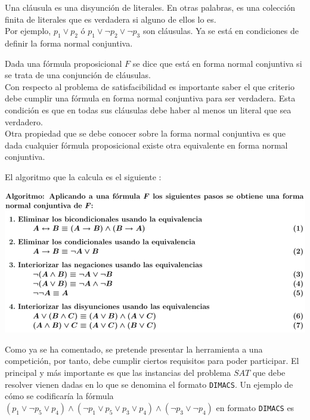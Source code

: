  Una cláusula es una disyunción de literales. En otras palabras, es una colección finita de literales que es verdadera si alguno de ellos lo es. \\

Por ejemplo, $p_1 \vee p_2$ ó $p_1 \vee \neg p_2 \vee \neg p_3$ son cláusulas. Ya se está en condiciones de definir la forma normal conjuntiva.

 Dada una fórmula proposicional $F$ se dice que está en forma normal conjuntiva si se trata de una conjunción de cláusulas. \\

Con respecto al problema de satisfacibilidad es importante saber el que criterio debe cumplir una fórmula en forma normal conjuntiva para ser verdadera. Esta condición es que en todas sus cláusulas debe haber al menos un literal que sea verdadero.\\

Otra propiedad que se debe conocer sobre la forma normal conjuntiva es que dada cualquier fórmula proposicional existe otra equivalente en forma normal conjuntiva. 

El algoritmo que la calcula es el siguiente \cite{apuntes} :

\begin{center}
\includegraphics[scale=0.45]{imagenes/algfnc}
\end{center}

Como ya se ha comentado, se pretende presentar la herramienta a una competición, por tanto, debe cumplir ciertos requisitos para poder participar. El principal y más importante es que las instancias del problema $SAT$ que debe resolver vienen dadas en lo que se denomina el formato \texttt{DIMACS}. Un ejemplo de cómo se codificaría la fórmula $(p_1 \vee \neg p_5 \vee p_4)\wedge(\neg p_1 \vee p_5 \vee p_3 \vee p_4) \wedge (\neg p_3 \vee \neg p_4)$ en formato \texttt{DIMACS} es

